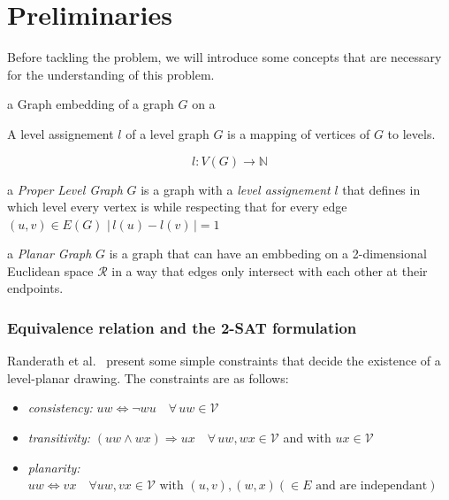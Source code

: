 
\chapter{Preliminaries}
\label{ch:preliminaries}


Before tackling the problem, we will introduce some concepts that are necessary 
for the understanding of this problem.
\begin{definition}
    a Graph embedding of a graph $G$ on a  
\end{definition}

\begin{definition}
   A level assignement $l$ of a level graph $G$ is a mapping of vertices of $G$ to levels. 

    \[
        l: V(G) \rightarrow \mathbb{N}
    \]
\end{definition}
\begin{definition}
    a \textit{Proper Level Graph} $G$ is a graph with a \textit{level assignement} $l$ that 
    defines in which level every vertex is while respecting that for every edge $\left( u,v \right) \in E(G) \,\, |\,l(u) - l(v)\,| = 1$
\end{definition}

\begin{definition}
    a \textit{Planar Graph} $G$ is a graph that can have an embbeding on a 2-dimensional Euclidean 
    space $\mathcal{R}$ in a way that edges 
    only intersect with each other at their endpoints.
\end{definition}

\subsection{Equivalence relation and the 2-SAT formulation}%
\label{sub:Equivalence relation and the 2-SAT formulation}
Randerath et al.~\cite{randerath2001satisfiability} present some simple constraints that decide the 
existence of a level-planar drawing. The constraints are as follows: 
\begin{itemize}
    \item \textit{consistency:} $ uw \iff \neg wu   \quad \forall \, uw \in \mathcal{V} $
    \item \textit{transitivity:} $ \left( uw \wedge wx \right) \Rightarrow ux  \quad \forall \, uw, wx \in \mathcal{V} $ and with $ux \in \mathcal{V}$
    \item \textit{planarity:} $uw \iff vx \quad \forall uw, vx \in \mathcal{V} \text{ with }  \left( u,v \right), \left( w,x \right) \left( \in E \text{ and are independant} \right)$ 
\end{itemize}


